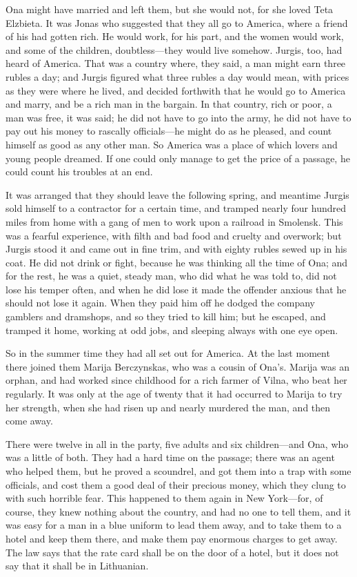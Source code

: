 \documentclass[
]{book}
\theoremstyle{definition}
\theoremstyle{definition}
\theoremstyle{definition}
\theoremstyle{definition}
\theoremstyle{remark}
\begin{document}
Ona might have married and left them, but she would not, for she loved Teta Elzbieta. It was Jonas who suggested that they all go to America, where a friend of his had gotten rich. He would work, for his part, and the women would work, and some of the children, doubtless---they would live somehow. Jurgis, too, had heard of America. That was a country where, they said, a man might earn three rubles a day; and Jurgis figured what three rubles a day would mean, with prices as they were where he lived, and decided forthwith that he would go to America and marry, and be a rich man in the bargain. In that country, rich or poor, a man was free, it was said; he did not have to go into the army, he did not have to pay out his money to rascally officials---he might do as he pleased, and count himself as good as any other man. So America was a place of which lovers and young people dreamed. If one could only manage to get the price of a passage, he could count his troubles at an end.

It was arranged that they should leave the following spring, and meantime Jurgis sold himself to a contractor for a certain time, and tramped nearly four hundred miles from home with a gang of men to work upon a railroad in Smolensk. This was a fearful experience, with filth and bad food and cruelty and overwork; but Jurgis stood it and came out in fine trim, and with eighty rubles sewed up in his coat. He did not drink or fight, because he was thinking all the time of Ona; and for the rest, he was a quiet, steady man, who did what he was told to, did not lose his temper often, and when he did lose it made the offender anxious that he should not lose it again. When they paid him off he dodged the company gamblers and dramshops, and so they tried to kill him; but he escaped, and tramped it home, working at odd jobs, and sleeping always with one eye open.

So in the summer time they had all set out for America. At the last moment there joined them Marija Berczynskas, who was a cousin of Ona's. Marija was an orphan, and had worked since childhood for a rich farmer of Vilna, who beat her regularly. It was only at the age of twenty that it had occurred to Marija to try her strength, when she had risen up and nearly murdered the man, and then come away.

There were twelve in all in the party, five adults and six children---and Ona, who was a little of both. They had a hard time on the passage; there was an agent who helped them, but he proved a scoundrel, and got them into a trap with some officials, and cost them a good deal of their precious money, which they clung to with such horrible fear. This happened to them again in New York---for, of course, they knew nothing about the country, and had no one to tell them, and it was easy for a man in a blue uniform to lead them away, and to take them to a hotel and keep them there, and make them pay enormous charges to get away. The law says that the rate card shall be on the door of a hotel, but it does not say that it shall be in Lithuanian.
\end{document}
